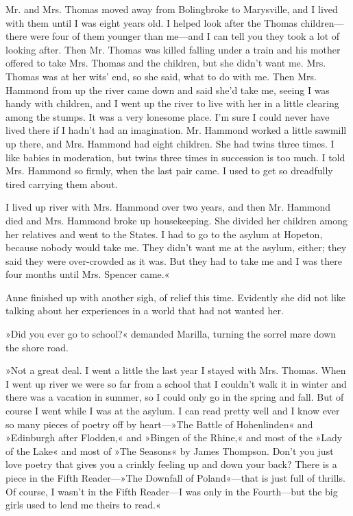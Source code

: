 Mr. and Mrs. Thomas moved away from Bolingbroke to Marysville, and I lived with them until I was eight years old. I helped look after the Thomas children—there were four of them younger than me—and I can tell you they took a lot of looking after. Then Mr. Thomas was killed falling under a train and his mother offered to take Mrs. Thomas and the children, but she didn't want me. Mrs. Thomas was at her wits' end, so she said, what to do with me. Then Mrs. Hammond from up the river came down and said she'd take me, seeing I was handy with children, and I went up the river to live with her in a little clearing among the stumps. It was a very lonesome place. I'm sure I could never have lived there if I hadn't had an imagination. Mr. Hammond worked a little sawmill up there, and Mrs. Hammond had eight children. She had twins three times. I like babies in moderation, but twins three times in succession is too much. I told Mrs. Hammond so firmly, when the last pair came. I used to get so dreadfully tired carrying them about.

I lived up river with Mrs. Hammond over two years, and then Mr. Hammond died and Mrs. Hammond broke up housekeeping. She divided her children among her relatives and went to the States. I had to go to the asylum at Hopeton, because nobody would take me. They didn't want me at the asylum, either; they said they were over-crowded as it was. But they had to take me and I was there four months until Mrs. Spencer came.«

Anne finished up with another sigh, of relief this time. Evidently she did not like talking about her experiences in a world that had not wanted her.

»Did you ever go to school?« demanded Marilla, turning the sorrel mare down the shore road.

»Not a great deal. I went a little the last year I stayed with Mrs. Thomas. When I went up river we were so far from a school that I couldn't walk it in winter and there was a vacation in summer, so I could only go in the spring and fall. But of course I went while I was at the asylum. I can read pretty well and I know ever so many pieces of poetry off by heart—»The Battle of Hohenlinden« and »Edinburgh after Flodden,« and »Bingen of the Rhine,« and most of the »Lady of the Lake« and most of »The Seasons« by James Thompson. Don't you just love poetry that gives you a crinkly feeling up and down your back? There is a piece in the Fifth Reader—»The Downfall of Poland«—that is just full of thrills. Of course, I wasn't in the Fifth Reader—I was only in the Fourth—but the big girls used to lend me theirs to read.«

